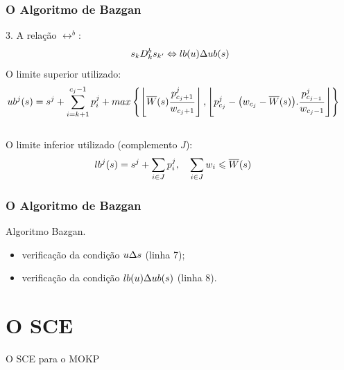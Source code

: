 \documentclass[10pt,xcolor=table,fleqn]{beamer}
\newcommand{\mytitle}[1]{
  \begin{center}
    \color{defblue}
    { \LARGE #1 }
  \end{center}
}
\begin{document}
\begin{frame}
	\frametitle{O Algoritmo de Bazgan}
  \begin{block}{3. A relação $\rel^{b}$:}
    \begin{displaymath}
      s_k D_k^{b} s_{{k'}}
        \Leftrightarrow
        lb(u) \Delta ub(s)
    \end{displaymath}
    \pause
    \vspace{6mm}
    O limite superior utilizado:
    \footnotesize
    \begin{equation*}
      \hspace{-5mm}
      ub^j(s) = s^j + \sum_{i=k+1}^{c_j-1} p_i^j +
        max\left\{ \left\lfloor\overline{W}(s)\frac{p^j_{c_j+1}}{w_{c_j+1}} \right\rfloor ,
         \left\lfloor p^j_{c_j} - \big(w_{c_j} - \overline{W}(s)\big).\frac{p^j_{c_{j-1}}}{w_{c_j-1}}
         \right\rfloor \right\}
    \end{equation*}
    \pause
    \\ \vspace{6mm}
    O limite inferior utilizado (complemento $J$):
    \footnotesize
    \begin{equation*}
      \hspace{-5mm}
      lb^j(s) = s^j + \sum_{i \in J}{p_i^j}, \quad
        \sum_{i \in J}{w_i} \leq \overline{W}(s)
    \end{equation*}
    \vspace{6mm}
  \end{block}
\end{frame}

\begin{frame}
	\frametitle{O Algoritmo de Bazgan}
  \begin{algorithm}[H]
    \footnotesize
    
    \caption{Algoritmo Bazgan.}
  \end{algorithm}
  \pause
  \begin{itemize}
    \item{ verificação da condição $u \Delta s$ (linha 7);} \pause
    \item{ verificação da condição $lb(u) \Delta ub(s)$ (linha 8).}
  \end{itemize}
\end{frame}

\section{O SCE}

\begin{frame}
	\mytitle{O SCE para o MOKP}
\end{frame}
\end{document}
